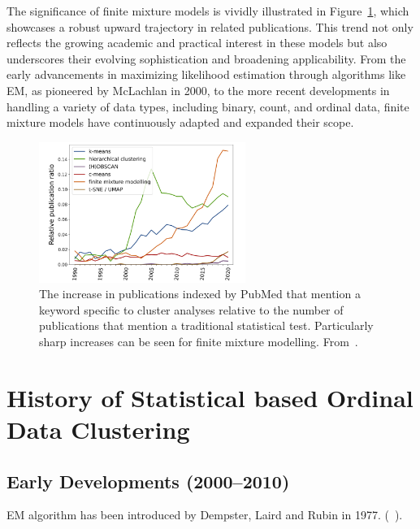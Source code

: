 \documentclass{article}
\begin{document}
The significance of finite mixture models is vividly illustrated in Figure~\ref{fig:trend}, which showcases a robust upward trajectory in related publications. This trend not only reflects the growing academic and practical interest in these models but also underscores their evolving sophistication and broadening applicability. From the early advancements in maximizing likelihood estimation through algorithms like EM, as pioneered by McLachlan in 2000, to the more recent developments in handling a variety of data types, including binary, count, and ordinal data, finite mixture models have continuously adapted and expanded their scope.

\begin{figure}[ht!] %
    \centering %
    \includegraphics[width=0.6\textwidth]{images/trend.png} %
    \caption{The increase in publications indexed by PubMed that mention a keyword specific to cluster analyses relative to the number of publications 
    that mention a traditional statistical test. 
    Particularly sharp increases can be seen for finite mixture modelling.
    From~\cite{dalmaijer2022statistical}.} %
    \label{fig:trend} %
  \end{figure}


\section{History of Statistical based Ordinal Data Clustering}

\subsection*{Early Developments (2000--2010)}

EM algorithm has been introduced by Dempster, Laird and Rubin in 1977. (~\cite*[Dempster, Laird and Rubin]{Dempster1977}).
\end{document}
